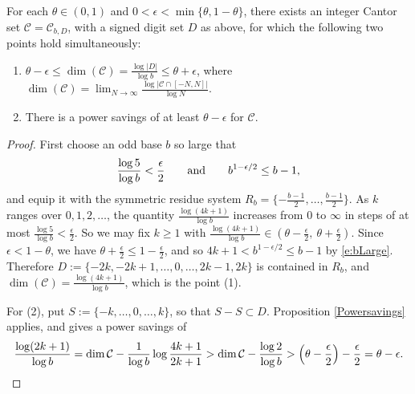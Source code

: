 \begin{proposition} \label{p:dimension}
    For each  $\theta \in (0,1)$ and $ 0<\epsilon<\min\{\theta ,1-\theta \}$, there exists an integer Cantor set $\mathcal{C}=\mathcal{C}_{b,D}$, with a signed digit set $D$ as above, for which the following two points hold simultaneously: 
    \begin{enumerate}
        \item[(1)] $  \theta -\epsilon \leq \dim(\mathcal{C})=\frac{\log |D|}{\log b}  \leq \theta + \epsilon$, where $\dim(\mathcal C)=\lim_{N\to\infty}\frac{\log\lvert\mathcal C\cap[-N,N]\rvert}{\log N}$. 
        \item[(2)] There is a power savings of at least $\theta -\epsilon$ 
        for $\mathcal{C}$. 
    \end{enumerate}
\end{proposition}

\begin{proof}
First choose an odd base $b$ so large that 
\begin{equation} \label{e:bLarge}
    \frac{\log 5}{\log b}<\frac \epsilon 2 \qquad\textup{and}\qquad b ^{1-\epsilon /2}\leq b-1 , 
\end{equation}
and equip it with the symmetric residue system $R_b=\{-\frac{b-1}2,\ldots,\frac{b-1}2\}$. 
As $k$ ranges over $0,1,2,\ldots$, the quantity $\frac{\log (4k+1)}{\log b}$ increases from $0$ to $\infty$ in steps of at most $\frac{\log 5}{\log b}<\frac \epsilon2$. 
So we may fix $k\geq 1$ with $\frac{\log(4k+1)}{\log b}\in (\theta -\frac \epsilon 2,\ \theta +\frac \epsilon 2)$. 
Since $\epsilon <1-\theta $, we have $\theta +\frac \epsilon 2\leq 1-\frac \epsilon 2$, and so $4k+1<b ^{1-\epsilon /2}\leq b-1$ by \eqref{e:bLarge}. 
Therefore $D:=\{-2k,-2k+1,\ldots ,0,\ldots ,2k-1,2k\}$ is contained in $R_b$, and $\dim (\mathcal{C})=\frac{\log (4k+1)}{\log b}$, which is the point (1). 

For (2), put $S:=\{-k,\ldots ,0,\ldots ,k\}$, so that $S-S\subset D$. 
Proposition \ref{Powersavings} applies, and gives a power savings of 
\begin{equation}
\frac{\log (2k+1)}{\log b}=\dim \mathcal{C}-\frac{1}{\log b}\log \frac{4k+1}{2k+1} 
> \dim \mathcal{C}-\frac{\log 2}{\log b} > \Bigl(\theta -\frac \epsilon 2\Bigr)-\frac \epsilon 2 = \theta -\epsilon . 
\end{equation}
\end{proof}

